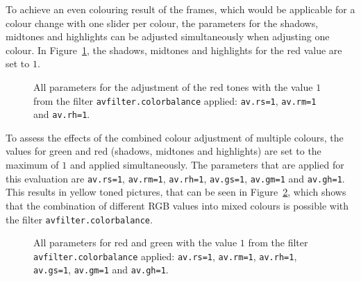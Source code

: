\documentclass[../MasterThesis.tex]{subfiles}
\begin{document}
To achieve an even colouring result of the frames, which would be applicable for a colour change with one slider per colour, the parameters for the shadows, midtones and highlights can be adjusted simultaneously when adjusting one colour. In Figure~\ref{figure:rsrmrh1}, the shadows, midtones and highlights for the red value are set to $1$. 

\begin{figure}[H]
	\begin{center}
		\caption[Parameters set to $1$ for red using the \texttt{avfilter.colorbalance} filter.]{All parameters for the adjustment of the red tones with the value $1$ from the filter \texttt{avfilter.colorbalance} applied: \texttt{av.rs=1}, \texttt{av.rm=1} and \texttt{av.rh=1}.}
		\label{figure:rsrmrh1}
	\end{center}
\end{figure}

To assess the effects of the combined colour adjustment of multiple colours, the values for green and red (shadows, midtones and highlights) are set to the maximum of $1$ and applied simultaneously. The parameters that are applied for this evaluation are \texttt{av.rs=1}, \texttt{av.rm=1}, \texttt{av.rh=1}, \texttt{av.gs=1}, \texttt{av.gm=1} and \texttt{av.gh=1}.
This results in yellow toned pictures, that can be seen in Figure~\ref{figure:cb_yellow}, which shows that the combination of different RGB values into mixed colours is possible with the filter \texttt{avfilter.colorbalance}.


\begin{figure}[H]
	\begin{center}
		\caption[Red and green parameters set to $1$ with \texttt{avfilter.colorbalance}.]{All parameters for red and green with the value $1$ from the filter \texttt{avfilter.colorbalance} applied: \texttt{av.rs=1}, \texttt{av.rm=1}, \texttt{av.rh=1}, \texttt{av.gs=1}, \texttt{av.gm=1} and \texttt{av.gh=1}.}
		\label{figure:cb_yellow}
	\end{center}
\end{figure}
\end{document}
